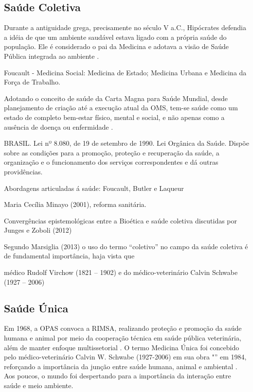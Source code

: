 \subsection{Saúde Coletiva}

\indent Durante a antiguidade grega, precisamente no século V a.C., Hipócrates defendia a idéia de que um ambiente saudável estava ligado com a própria saúde do população. Ele é considerado o pai da Medicina e adotava a visão de Saúde Pública integrada ao ambiente \cite{CFMVSaude}.

\indent Foucault - Medicina Social: Medicina de Estado; Medicina Urbana e Medicina da Força de Trabalho. 

\indent 

\indent Adotando o conceito de saúde da Carta Magna para Saúde Mundial, desde planejamento de criação até a execução atual da \acrfull{OMS}, tem-se saúde como um estado de completo bem-estar físico, mental e social, e não apenas como a ausência de doença ou enfermidade \cite{OMS2024S1, ParranHEALTH}.

\indent BRASIL. Lei nº 8.080, de 19 de setembro de 1990. Lei Orgânica da Saúde. Dispõe sobre as condições  para a promoção, proteção  e  recuperação  da  saúde,  a  organização  e  o  funcionamento  dos  serviços correspondentes  e  dá  outras providências.



\indent Abordagens articuladas á saúde: Foucault, Butler e Laqueur

\indent Maria Cecília Minayo (2001), reforma sanitária.

\indent Convergências epistemológicas entre a Bioética e saúde coletiva discutidas por Junges
e Zoboli (2012)

\indent Segundo Marsiglia (2013) o uso do termo “coletivo” no campo da saúde coletiva é de
fundamental importância, haja vista que

\indent médico Rudolf Virchow (1821 – 1902) e do médico-veterinário Calvin Schwabe (1927 – 2006)

\subsection{Saúde Única}

\indent Em 1968, a \acrfull{OPAS} convoca a \acrfull{RIMSA}, realizando proteção e promoção da saúde humana e animal por meio da cooperação técnica em saúde pública veterinária, além de manter enfoque multissetorial \cite{S1_OPAS_OMS}. O termo Medicina Única foi concebido pelo médico-veterinário Calvin W. Schwabe (1927-2006) em sua obra "” em 1984, reforçando a importância da junção entre saúde humana, animal e ambiental \cite{CFMVSaude}. Aos poucos, o mundo foi despertando para a importância da interação entre saúde e meio ambiente.

